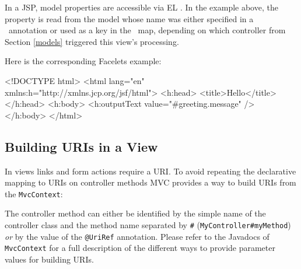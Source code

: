 In a JSP, model properties are accessible via EL \cite{el}. In the example above,
the property  is read from the  model whose name
was either specified in a \Named\ annotation or used as a key in the \Models\ map, 
depending on which controller from Section \ref{models} triggered this view's 
processing.

Here is the corresponding Facelets example:

\begin{listing}{1}
<!DOCTYPE html>
<html lang="en" xmlns:h="http://xmlns.jcp.org/jsf/html">
<h:head>
    <title>Hello</title>
</h:head>
<h:body>
    <h:outputText value="#{greeting.message}" />
</h:body>
</html>
\end{listing}

\subsection{Building URIs in a View}
\label{mvc_uri}

In views links and form actions require a URI. To avoid repeating the declarative
mapping to URIs on controller methods MVC provides a way to build URIs from the
{\tt MvcContext}:


The controller method can either be identified by the simple name of the controller class
and the method name separated by {\tt \#} ({\tt MyController\#myMethod}) {\em or} by the
value of the {\tt @UriRef} annotation. Please refer to the Javadocs of {\tt MvcContext}
for a full description of the different ways to provide parameter values for building URIs.
